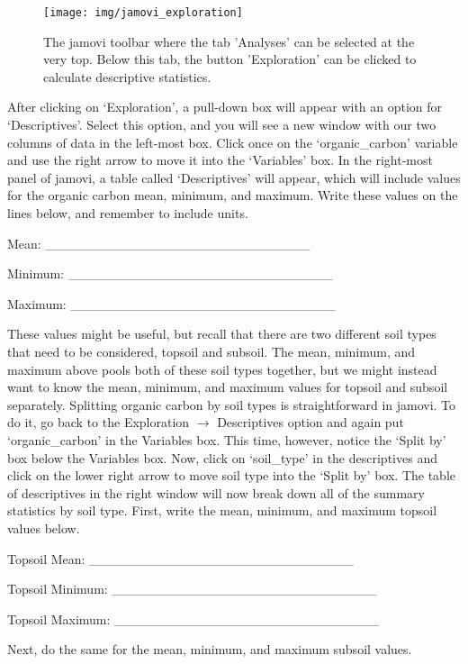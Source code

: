 \documentclass[
]{scrbook}
\begin{document}
\begin{figure}
\texttt{[image: img/jamovi\_exploration]} \caption{The jamovi toolbar where the tab 'Analyses' can be selected at the very top. Below this tab, the button 'Exploration' can be clicked to calculate descriptive statistics.}\label{fig:unnamed-chunk-28}
\end{figure}

After clicking on `Exploration', a pull-down box will appear with an option for `Descriptives'.
Select this option, and you will see a new window with our two columns of data in the left-most box.
Click once on the `organic\_carbon' variable and use the right arrow to move it into the `Variables' box.
In the right-most panel of jamovi, a table called `Descriptives' will appear, which will include values for the organic carbon mean, minimum, and maximum.
Write these values on the lines below, and remember to include units.

Mean: \_\_\_\_\_\_\_\_\_\_\_\_\_\_\_\_\_\_\_\_\_\_\_\_\_\_\_\_

Minimum: \_\_\_\_\_\_\_\_\_\_\_\_\_\_\_\_\_\_\_\_\_\_\_\_\_\_\_\_

Maximum: \_\_\_\_\_\_\_\_\_\_\_\_\_\_\_\_\_\_\_\_\_\_\_\_\_\_\_\_

These values might be useful, but recall that there are two different soil types that need to be considered, topsoil and subsoil.
The mean, minimum, and maximum above pools both of these soil types together, but we might instead want to know the mean, minimum, and maximum values for topsoil and subsoil separately.
Splitting organic carbon by soil types is straightforward in jamovi.
To do it, go back to the Exploration \(\to\) Descriptives option and again put `organic\_carbon' in the Variables box.
This time, however, notice the `Split by' box below the Variables box.
Now, click on `soil\_type' in the descriptives and click on the lower right arrow to move soil type into the `Split by' box.
The table of descriptives in the right window will now break down all of the summary statistics by soil type.
First, write the mean, minimum, and maximum topsoil values below.

Topsoil Mean: \_\_\_\_\_\_\_\_\_\_\_\_\_\_\_\_\_\_\_\_\_\_\_\_\_\_\_\_

Topsoil Minimum: \_\_\_\_\_\_\_\_\_\_\_\_\_\_\_\_\_\_\_\_\_\_\_\_\_\_\_\_

Topsoil Maximum: \_\_\_\_\_\_\_\_\_\_\_\_\_\_\_\_\_\_\_\_\_\_\_\_\_\_\_\_

Next, do the same for the mean, minimum, and maximum subsoil values.
\end{document}
